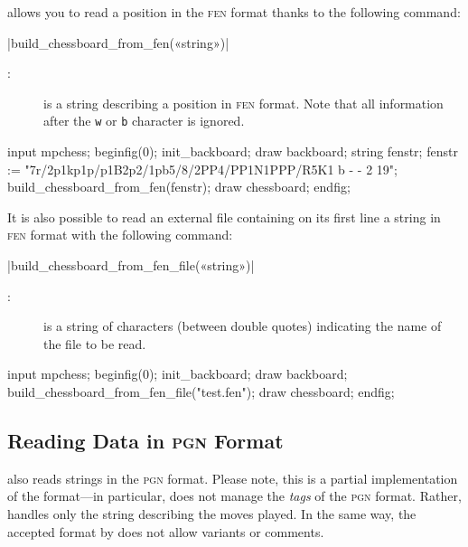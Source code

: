 \documentclass[english]{ltxdoc}
\begin{document}
\mpchess allows you to read a position in the \textsc{fen} format thanks to the following command:

\commande|build_chessboard_from_fen(«string»)|\smallskip

\begin{description}
\item[:] is a string describing a position in
\textsc{fen} format. Note that all information after the 
\texttt{w} or \texttt{b} character is ignored. 
\end{description}

\begin{ExempleMP}
input mpchess;
beginfig(0);
init_backboard;
draw backboard;
string fenstr;
fenstr := "7r/2p1kp1p/p1B2p2/1pb5/8/2PP4/PP1N1PPP/R5K1 b - - 2 19";
build_chessboard_from_fen(fenstr);
draw chessboard;
endfig;
\end{ExempleMP}


It is also possible to read an external file containing on its first line a
string in \textsc{fen} format with the following command:

\commande|build_chessboard_from_fen_file(«string»)|\smallskip

\begin{description}
  \item[:] is a string of characters (between double quotes)
  indicating the name of the file to be read.  
\end{description}


\begin{ExempleMP}
input mpchess;
beginfig(0);
init_backboard;
draw backboard;
build_chessboard_from_fen_file("test.fen");
draw chessboard;
endfig;
\end{ExempleMP}

\subsection{Reading Data in \textsc{pgn} Format}

\mpchess also reads strings in the \textsc{pgn} format.
Please note, this is a partial implementation of the format---in particular, \mpchess
does not manage the \emph{tags} of the \textsc{pgn} format. Rather, \mpchess handles only
the string describing the moves played. In the same way, the accepted format
 by \mpchess does not allow variants or comments.
\end{document}

